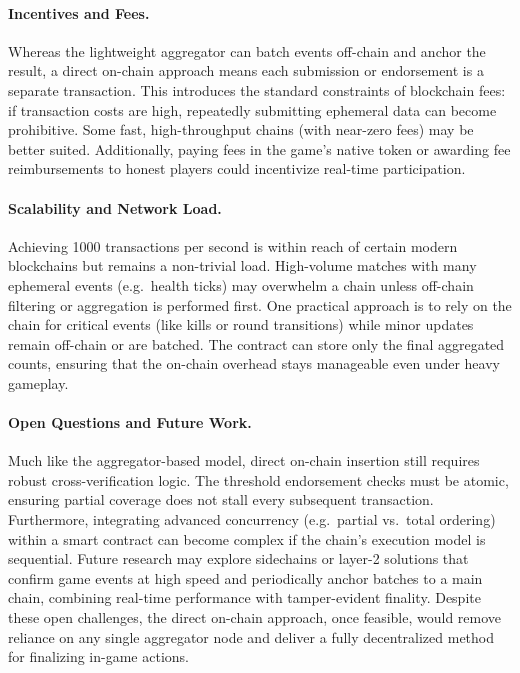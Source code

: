 \documentclass[11pt]{article}
\begin{document}
\paragraph{Incentives and Fees.}
Whereas the lightweight aggregator can batch events off-chain and anchor the result, a direct on-chain approach means each submission or endorsement is a separate transaction. This introduces the standard constraints of blockchain fees: if transaction costs are high, repeatedly submitting ephemeral data can become prohibitive. Some fast, high-throughput chains (with near-zero fees) may be better suited. Additionally, paying fees in the game’s native token or awarding fee reimbursements to honest players could incentivize real-time participation.

\paragraph{Scalability and Network Load.}
Achieving 1000 transactions per second is within reach of certain modern blockchains but remains a non-trivial load. High-volume matches with many ephemeral events (e.g.\ health ticks) may overwhelm a chain unless off-chain filtering or aggregation is performed first. One practical approach is to rely on the chain for critical events (like kills or round transitions) while minor updates remain off-chain or are batched. The contract can store only the final aggregated counts, ensuring that the on-chain overhead stays manageable even under heavy gameplay.

\paragraph{Open Questions and Future Work.}
Much like the aggregator-based model, direct on-chain insertion still requires robust cross-verification logic. The threshold endorsement checks must be atomic, ensuring partial coverage does not stall every subsequent transaction. Furthermore, integrating advanced concurrency (e.g.\ partial vs.\ total ordering) within a smart contract can become complex if the chain’s execution model is sequential. Future research may explore sidechains or layer-2 solutions that confirm game events at high speed and periodically anchor batches to a main chain, combining real-time performance with tamper-evident finality. Despite these open challenges, the direct on-chain approach, once feasible, would remove reliance on any single aggregator node and deliver a fully decentralized method for finalizing in-game actions.
\end{document}
